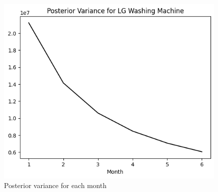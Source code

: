 \begin{figure}[!ht]
  \centering
  \includegraphics[width=.5\textwidth]{images/var.png}
  \caption{Posterior variance for each month}
\end{figure}
